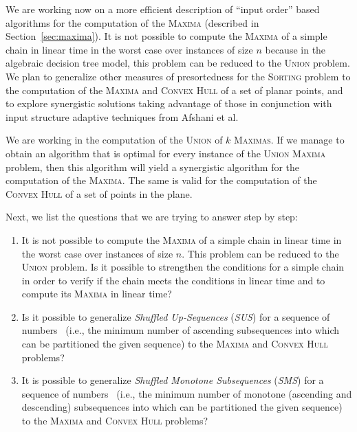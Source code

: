 We are working now on a more efficient description of ``input order''
based algorithms for the computation of the \textsc{Maxima} (described
in Section~\ref{sec:maxima}). It is not possible to compute the
\textsc{Maxima} of a simple chain in linear time in the worst case
over instances of size $n$ because in the algebraic decision tree
model, this problem can be reduced to the \textsc{Union} problem. We
plan to generalize other measures of presortedness for the
\textsc{Sorting} problem to the computation of the \textsc{Maxima} and
\textsc{Convex Hull} of a set of planar points, and to explore
synergistic solutions taking advantage of those in conjunction with
input structure adaptive techniques from Afshani et al.

We are working in the computation of the \textsc{Union} of $k$
\textsc{Maximas}. If we manage to obtain an algorithm that is optimal
for every instance of the \textsc{Union Maxima} problem, then this
algorithm will yield a synergistic algorithm for the computation of the
\textsc{Maxima}. The same is valid for the computation of the
\textsc{Convex Hull} of a set of points in the plane.

\begin{INUTILE}
  Next, we list the questions that we are trying to answer step by
  step:

  \begin{enumerate}
  \item It is not possible to compute the \textsc{Maxima} of a simple
    chain in linear time in the worst case over instances of size
    $n$. This problem can be reduced to the \textsc{Union} problem. Is
    it possible to strengthen the conditions for a simple chain in
    order to verify if the chain meets the conditions in linear time
    and to compute its \textsc{Maxima} in linear time?
  \item Is it possible to generalize \emph{Shuffled Up-Sequences}
    (\emph{SUS}) for a sequence of
    numbers~\cite{1990-SWAT-SortingShuffledMonotoneSequences-LevcopoulosPetersson}
    (i.e., the minimum number of ascending subsequences into which can
    be partitioned the given sequence) to the \textsc{Maxima} and
    \textsc{Convex Hull} problems?
  \item It is possible to generalize \emph{Shuffled Monotone
      Subsequences} (\emph{SMS}) for a sequence of
    numbers~\cite{1990-SWAT-SortingShuffledMonotoneSequences-LevcopoulosPetersson}
    (i.e., the minimum number of monotone (ascending and descending)
    subsequences into which can be partitioned the given sequence) to
    the \textsc{Maxima} and \textsc{Convex Hull} problems?
  \end{enumerate}
\end{INUTILE}

